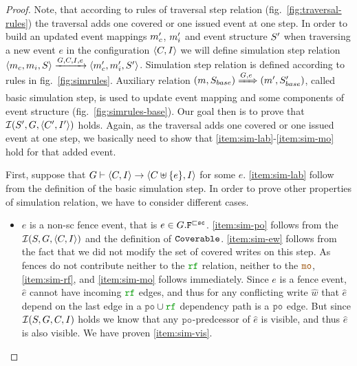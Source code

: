 \documentclass[12pt]{article}
\begin{document}
\begin{proof}
  
  Note, that according to rules of traversal step relation (fig.~\ref{fig:traversal-rules})
  the traversal adds one covered or one issued event at one step.
  In order to build an updated event mappings $m_{c}'$, $m_{i}'$ 
  and event structure $S'$ 
  when traversing a new event $e$ in the configuration $\langle C, I \rangle$
  we will define simulation step relation 
  $\langle m_{c}, m_{i}, S \rangle \xrightarrow{G, C, I, e} \langle m_{c}', m_{i}', S' \rangle$.
  Simulation step relation is defined according to rules in fig.~\ref{fig:simrules}.
  Auxiliary relation 
  $(m, S_{base}) \xRightarrow{G, e} (m', S'_{base})$,
  called basic simulation step, 
  is used to update event mapping and some components of event structure
  (fig.~\ref{fig:simrules-base}).
  Our goal then is to prove that $\mathcal{I}(S', G, \langle C', I' \rangle)$ holds.
  Again, as the traversal adds one covered or one issued event at one step,
  we basically need to show that \ref{item:sim-lab}-\ref{item:sim-mo} hold
  for that added event.

  First, suppose that 
  $G \vdash \langle C, I \rangle \rightarrow \langle C \uplus \{e\}, I \rangle$ for some $e$.
  \ref{item:sim-lab} follow from the definition of the basic simulation step.
  In order to prove other properties of simulation relation,
  we have to consider different cases.

  \begin{itemize}
    \item $e$ is a non-sc fence event, that is $e \in G.{\mathtt{F}}^{\sqsubset{\mathtt{sc}}}$.
      \ref{item:sim-po} follows from the $\mathcal{I}(S, G, \langle C, I \rangle)$ 
      and the definition of ${\mathtt{Coverable}}$.
      \ref{item:sim-ew} follows from the fact that
      we did not modify the set of covered writes on this step.
      As fences do not contribute neither to the $\lRF$ relation, neither to the $\lMO$, 
      \ref{item:sim-rf}, and \ref{item:sim-mo} follows immediately.
      Since $e$ is a fence event, $\hat{e}$ cannot have incoming $\lRF$ edges,
      and thus for any conflicting write $\hat{w}$ that $\hat{e}$ depend on
      the last edge in a $\lPO \cup \lRF$ dependency path is a $\lPO$ edge.
      But since $\mathcal{I}(S, G, C, I)$ holds we know that 
      any $\lPO$-predcessor of $\hat{e}$ is visible, and thus $\hat{e}$ is also visible.
      We have proven \ref{item:sim-vis}.


\end{itemize}
\end{proof}
\end{document}
